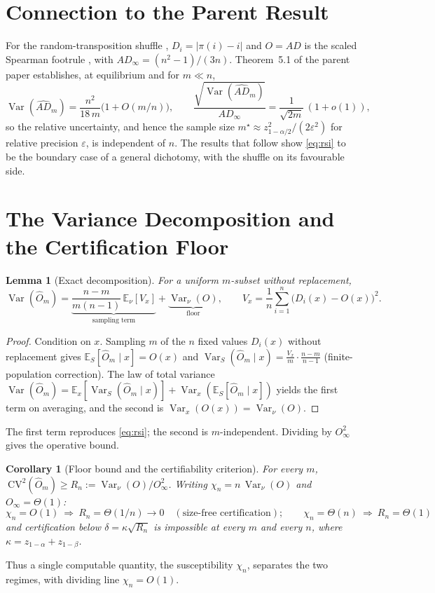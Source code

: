 \documentclass[11pt]{article}
\newtheorem{lemma}{Lemma}
\newtheorem{corollary}{Corollary}
\theoremstyle{definition}
\newcommand{\Var}{\operatorname{Var}}
\newcommand{\E}{\mathbb{E}}
\newcommand{\Rn}{R_n}
\newcommand{\ADm}{\widehat{AD}_m}
\newcommand{\Om}{\widehat{O}_m}
\newcommand{\ADinf}{AD_\infty}
\begin{document}
\section{Connection to the Parent Result}
For the random-transposition shuffle \citep{ds}, $D_i=|\pi(i)-i|$ and $O=AD$ is the scaled Spearman footrule \citep{dg}, with $\ADinf=(n^2-1)/(3n)$. Theorem~5.1 of the parent paper establishes, at equilibrium and for $m\ll n$,
\begin{equation}\label{eq:rsi}
\Var(\ADm)=\frac{n^2}{18\,m}\bigl(1+O(m/n)\bigr),\qquad
\frac{\sqrt{\Var(\ADm)}}{\ADinf}=\frac{1}{\sqrt{2m}}\,(1+o(1)),
\end{equation}
so the relative uncertainty, and hence the sample size $m^\star\approx z_{1-\alpha/2}^2/(2\varepsilon^2)$ for relative precision $\varepsilon$, is independent of $n$. The results that follow show \eqref{eq:rsi} to be the boundary case of a general dichotomy, with the shuffle on its favourable side.

\section{The Variance Decomposition and the Certification Floor}
\begin{lemma}[Exact decomposition]\label{lem:decomp}
For a uniform $m$-subset without replacement,
\[
\Var(\Om)=\underbrace{\frac{n-m}{m(n-1)}\,\E_\nu[V_x]}_{\text{sampling term}}+\underbrace{\Var_\nu(O)}_{\text{floor}},
\qquad V_x=\frac1n\sum_{i=1}^n\bigl(D_i(x)-O(x)\bigr)^2 .
\]
\end{lemma}
\begin{proof}
Condition on $x$. Sampling $m$ of the $n$ fixed values $D_i(x)$ without replacement gives $\E_S[\Om\mid x]=O(x)$ and $\Var_S(\Om\mid x)=\tfrac{V_x}{m}\cdot\tfrac{n-m}{n-1}$ (finite-population correction). The law of total variance $\Var(\Om)=\E_x[\Var_S(\Om\mid x)]+\Var_x(\E_S[\Om\mid x])$ yields the first term on averaging, and the second is $\Var_x(O(x))=\Var_\nu(O)$.
\end{proof}

\noindent The first term reproduces \eqref{eq:rsi}; the second is $m$-independent. Dividing by $O_\infty^2$ gives the operative bound.
\begin{corollary}[Floor bound and the certifiability criterion]\label{cor:floor}
For every $m$, $\ \mathrm{CV}^2(\Om)\ge \Rn:=\Var_\nu(O)/O_\infty^2$. Writing $\chi_n=n\,\Var_\nu(O)$ and $O_\infty=\Theta(1)$:
\[
\chi_n=O(1)\ \Longrightarrow\ \Rn=\Theta(1/n)\to 0 \quad(\text{size-free certification}); \qquad
\chi_n=\Theta(n)\ \Longrightarrow\ \Rn=\Theta(1)
\]
and certification below $\delta=\kappa\sqrt{\Rn}$ is impossible at every $m$ and every $n$, where $\kappa=z_{1-\alpha}+z_{1-\beta}$.
\end{corollary}
Thus a single computable quantity, the susceptibility $\chi_n$, separates the two regimes, with dividing line $\chi_n=O(1)$.
\end{document}

